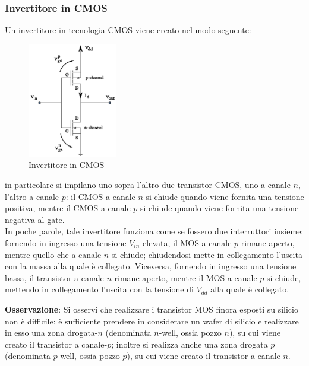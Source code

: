 \documentclass[a4paper]{extarticle}
\begin{document}
\vspace{1em}
\noindent
\subsubsection{Invertitore in CMOS}
Un invertitore in tecnologia CMOS viene creato nel modo seguente:

\begin{figure}[H]
    \centering
    \includegraphics[width=0.35\textwidth]{invertitore-cmos.png}
    \caption{Invertitore in CMOS}
    \label{fig:invertitore_cmos}
\end{figure}

\vspace{1em}
\noindent
in particolare si impilano uno sopra l'altro due transistor CMOS, uno a canale $n$, l'altro a canale $p$: il CMOS a canale $n$ si chiude quando viene fornita una tensione positiva, mentre il CMOS a canale $p$ si chiude quando viene fornita una tensione negativa al gate.\\
In poche parole, tale invertitore funziona come se fossero due interruttori insieme: fornendo in ingresso una tensione $V_{in}$ elevata, il MOS a canale-$p$ rimane aperto, mentre quello che a canale-$n$ si chiude; chiudendosi mette in collegamento l'uscita con la massa alla quale è collegato. Viceversa, fornendo in ingresso una tensione bassa, il transistor a canale-$n$ rimane aperto, mentre il MOS a canale-$p$ si chiude, mettendo in collegamento l'uscita con la tensione di $V_{dd}$ alla quale è collegato.

\vspace{1em}
\noindent
\textbf{Osservazione}: Si osservi che realizzare i transistor MOS finora esposti su silicio non è difficile: è sufficiente prendere in considerare un wafer di silicio e realizzare in esso una zona drogata-$n$ (denominata $n$-well, ossia pozzo $n$), su cui viene creato il transistor a canale-$p$; inoltre si realizza anche una zona drogata $p$ (denominata $p$-well, ossia pozzo $p$), su cui viene creato il transistor a canale $n$.
\end{document}
